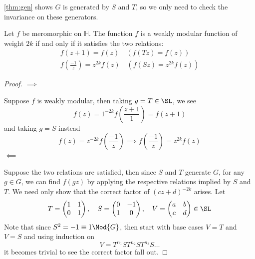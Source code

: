 \documentclass[12pt]{article}
\theoremstyle{definition}
\begin{document}
\cref{thm:gen} shows \(G\) is generated by \(S\) and \(T\), so  we only need to check the invariance on these generators.
\begin{prop}
Let \(f\) be meromorphic on \(\mathbb{H}\). The function \(f\) is a weakly modular function of weight \(2k\) if and only if it satisfies the two relations:
\begin{align*}
f(z+1) = f(z) \quad (f(Tz)=f(z))\\
f\left(\frac{-1}{z}\right) = z^{2k}f(z) \quad (f(Sz) = z^{2k}f(z))
\end{align*}
\end{prop}  
\begin{proof}
\(\implies\)

\smallskip 
Suppose \(f\) is weakly modular, then taking \(g = T \in \SL\), we see
\[
    f(z) = 1^{-2k} f\left(\frac{z+1}{1}\right) = f(z+1)
\] 
and taking \(g= S\) instead
\[
    f(z) = z^{-2k} f\left(\frac{-1}{z}\right) \implies f\left(\frac{-1}{z}\right) = z^{2k}f(z)
\] 
\(\impliedby\)

\smallskip
Suppose the two relations are satisfied, then since \(S\) and \(T\) generate \(G\), for any \(g\in G\), we can find \(f(gz)\) by applying the respective relations implied by \(S\) and \(T\). We need only show that the correct factor of \((cz+d)^{-2k}\) arises. 
Let 
\[
    T = \begin{pmatrix}
        1 &  1 \\
        0 &  1 \\
    \end{pmatrix}, \quad S = \begin{pmatrix}
        0 &  -1 \\
        1 &  0 \\
    \end{pmatrix}, \quad V = \begin{pmatrix}
        a & b  \\
        c & d  \\
    \end{pmatrix} \in \SL
\] 
Note that since \(S^2 = -1 \equiv 1 \Mod{G}\), then start with base cases \(V=T\) and \(V=S\) and using induction on  
\[
    V = T^{n_1}S T^{n_2}S T^{n_3}S\dots
\] 
it becomes trivial to see the correct factor fall out.
\end{proof}
\end{document}
